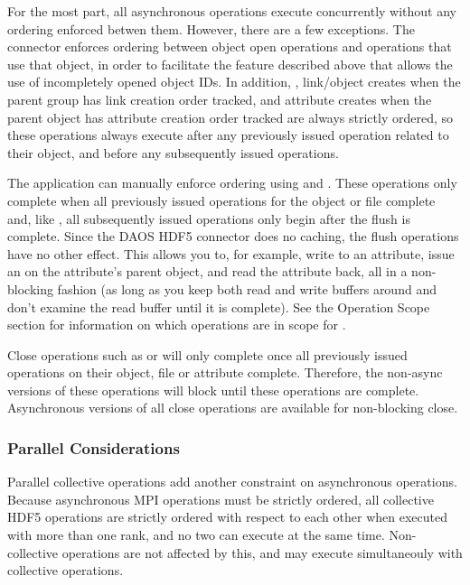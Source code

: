 \documentclass[../users_guide.tex]{subfiles}
\begin{document}
For the most part, all asynchronous operations execute concurrently without any
ordering enforced betwen them. However, there are a few exceptions. The
connector enforces ordering between object open operations and operations that
use that object, in order to facilitate the feature described above that allows
the use of incompletely opened object IDs. In addition,
, link/object creates when the parent group
has link creation order tracked, and attribute creates when the parent object
has attribute creation order tracked are always strictly ordered, so these
operations always execute after any previously issued operation related to their
object, and before any subsequently issued operations.

The application can manually enforce ordering using
 and . These
operations only complete when all previously issued operations for the object or
file complete and, like , all subsequently
issued operations only begin after the flush is complete. Since the DAOS HDF5
connector does no caching, the flush operations have no other effect. This
allows you to, for example, write to an attribute, issue an
 on the attribute's parent object, and read the
attribute back, all in a non-blocking fashion (as long as you keep both read and
write buffers around and don't examine the read buffer until it is complete).
See the Operation Scope section for information on which operations are in scope
for .

Close operations such as  or 
will only complete once all previously issued operations on their object, file
or attribute complete. Therefore, the non-async versions of these operations
will block until these operations are complete. Asynchronous versions of all
close operations are available for non-blocking close.

\subsubsection {Parallel Considerations}

Parallel collective operations add another constraint on asynchronous
operations. Because asynchronous MPI operations must be strictly ordered, all
collective HDF5 operations are strictly ordered with respect to each other when
executed with more than one rank, and no two can execute at the same time.
Non-collective operations are not affected by this, and may execute
simultaneouly with collective operations.
\end{document}

